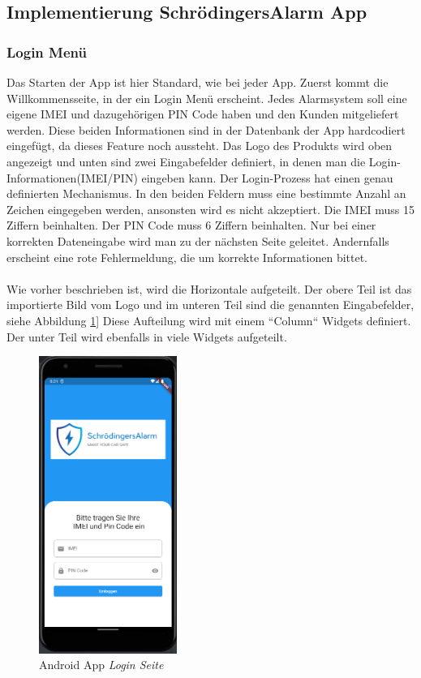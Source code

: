 \subsection{Implementierung SchrödingersAlarm App}
\subsubsection{Login Menü}
Das Starten der App ist hier Standard, wie bei jeder App. Zuerst kommt die Willkommensseite, in der ein Login Menü erscheint.
Jedes Alarmsystem soll eine eigene IMEI und dazugehörigen PIN Code haben und den Kunden mitgeliefert werden.
Diese beiden Informationen sind in der Datenbank  der App hardcodiert eingefügt, da dieses Feature noch aussteht. 
Das Logo des Produkts wird oben angezeigt und unten sind zwei Eingabefelder definiert,
in denen man die Login-Informationen(IMEI/PIN) eingeben kann. Der Login-Prozess hat einen genau definierten Mechanismus. In den beiden Feldern muss eine bestimmte Anzahl an Zeichen eingegeben werden, ansonsten wird es nicht akzeptiert. Die IMEI muss 15 Ziffern beinhalten. Der PIN Code muss 6 Ziffern beinhalten. Nur bei einer korrekten Dateneingabe wird man zu der nächsten Seite geleitet.
Andernfalls erscheint eine rote Fehlermeldung, die um korrekte Informationen bittet.\\\\
Wie vorher beschrieben ist, wird die Horizontale aufgeteilt. Der obere Teil ist das importierte Bild vom Logo und im unteren Teil sind die genannten Eingabefelder, siehe Abbildung \ref{login}]
Diese Aufteilung wird mit einem “Column“ Widgets definiert. Der unter Teil wird ebenfalls in viele Widgets aufgeteilt.


 \begin{figure}[H]
            \centering
            \includegraphics[width=0.4\textwidth]{Bilder/LoginIn.PNG}
            \caption{Android App \textit{Login Seite}}
            \label{login}
    \end{figure}

